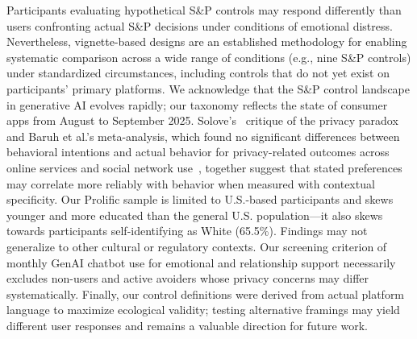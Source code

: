 \documentclass[letterpaper,twocolumn,10pt]{article}
\begin{document}
Participants evaluating hypothetical S\&P controls may respond differently than users confronting actual S\&P decisions under conditions of emotional distress. Nevertheless, vignette-based designs are an established methodology for enabling systematic comparison across a wide range of conditions (e.g., nine S\&P controls) under standardized circumstances, including controls that do not yet exist on participants' primary platforms. We acknowledge that the S\&P control landscape in generative AI evolves rapidly; our taxonomy reflects the state of consumer apps from August to September 2025. Solove's~\cite{solove2021myth} critique of the privacy paradox and Baruh et al.'s meta-analysis, which found no significant differences between behavioral intentions and actual behavior for privacy-related outcomes across online services and social network use~\cite{baruh2017privacy}, together suggest that stated preferences may correlate 
more reliably with behavior when measured with contextual specificity. Our Prolific sample is limited to U.S.-based participants and skews younger and more educated than the general U.S. population---it also skews towards participants self-identifying as White (65.5\%). Findings may not generalize to other cultural or regulatory contexts. Our screening criterion of monthly GenAI chatbot use for emotional and relationship support necessarily excludes non-users and active avoiders whose privacy concerns may differ systematically. Finally, our control definitions were derived from actual platform language to maximize ecological validity; testing alternative framings may yield different user responses and remains a valuable direction for future work.
\end{document}
